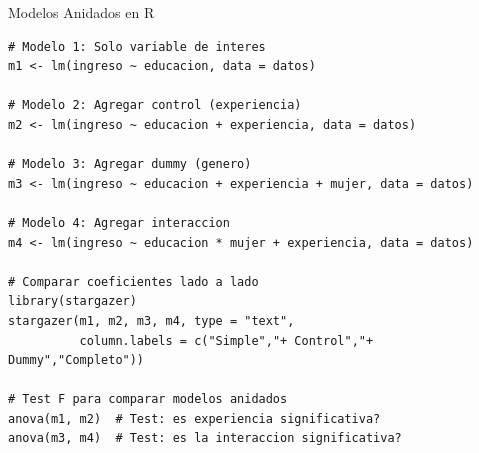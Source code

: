 \documentclass[aspectratio=169,11pt]{beamer}
\begin{document}
\begin{frame}[fragile]{Modelos Anidados en R}
\tiny
\begin{lstlisting}
# Modelo 1: Solo variable de interes
m1 <- lm(ingreso ~ educacion, data = datos)

# Modelo 2: Agregar control (experiencia)
m2 <- lm(ingreso ~ educacion + experiencia, data = datos)

# Modelo 3: Agregar dummy (genero)
m3 <- lm(ingreso ~ educacion + experiencia + mujer, data = datos)

# Modelo 4: Agregar interaccion
m4 <- lm(ingreso ~ educacion * mujer + experiencia, data = datos)

# Comparar coeficientes lado a lado
library(stargazer)
stargazer(m1, m2, m3, m4, type = "text",
          column.labels = c("Simple","+ Control","+ Dummy","Completo"))

# Test F para comparar modelos anidados
anova(m1, m2)  # Test: es experiencia significativa?
anova(m3, m4)  # Test: es la interaccion significativa?
\end{lstlisting}
\end{frame}
\end{document}
